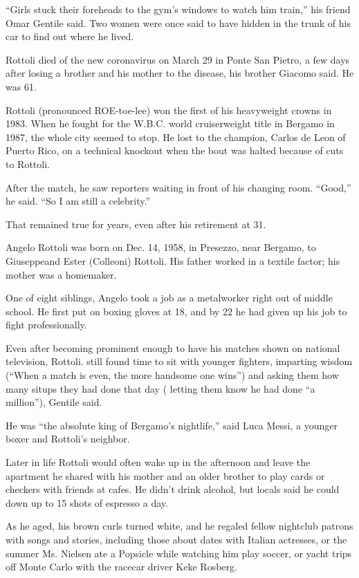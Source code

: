 ``Girls stuck their foreheads to the gym's windows to watch him train,''
his friend Omar Gentile said. Two women were once said to have hidden in
the trunk of his car to find out where he lived.

Rottoli died of the new coronavirus on March 29 in Ponte San Pietro, a
few days after losing a brother and his mother to the disease, his
brother Giacomo said. He was 61.

Rottoli (pronounced ROE-toe-lee) won the first of his heavyweight crowns
in 1983. When he fought for the W.B.C. world cruiserweight title in
Bergamo in 1987, the whole city seemed to stop. He lost to the champion,
Carlos de Leon of Puerto Rico, on a technical knockout when the bout was
halted because of cuts to Rottoli.

After the match, he saw reporters waiting in front of his changing room.
``Good,'' he said. ``So I am still a celebrity.''

That remained true for years, even after his retirement at 31.

Angelo Rottoli was born on Dec. 14, 1958, in Presezzo, near Bergamo, to
Giuseppeand Ester (Colleoni) Rottoli. His father worked in a textile
factor; his mother was a homemaker.

One of eight siblings, Angelo took a job as a metalworker right out of
middle school. He first put on boxing gloves at 18, and by 22 he had
given up his job to fight professionally.

Even after becoming prominent enough to have his matches shown on
national television, Rottoli. still found time to sit with younger
fighters, imparting wisdom (``When a match is even, the more handsome
one wins'') and asking them how many situps they had done that day (
letting them know he had done ``a million''), Gentile said.

He was ``the absolute king of Bergamo's nightlife,'' said Luca Messi, a
younger boxer and Rottoli's neighbor.

Later in life Rottoli would often wake up in the afternoon and leave the
apartment he shared with his mother and an older brother to play cards
or checkers with friends at cafes. He didn't drink alcohol, but locals
said he could down up to 15 shots of espresso a day.

As he aged, his brown curls turned white, and he regaled fellow
nightclub patrons with songs and stories, including those about dates
with Italian actresses, or the summer Ms. Nielsen ate a Popsicle while
watching him play soccer, or yacht trips off Monte Carlo with the
racecar driver Keke Rosberg.

